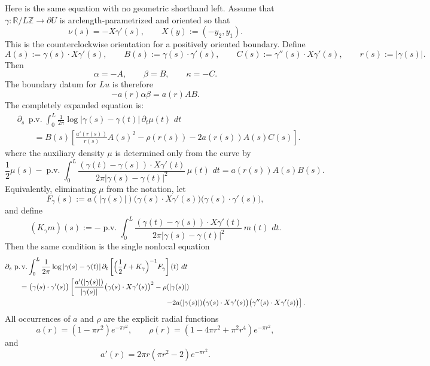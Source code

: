 \documentclass[11pt]{article}
\newcommand{\R}{\mathbb R}
\newcommand{\dd}{\,d}
\newcommand{\1}{\mathbf 1}
\begin{document}
Here is the same equation with no geometric shorthand left.  Assume that
\(\gamma:\R/L\mathbb Z\to\partial U\) is arclength-parametrized and oriented so that
\[
  \nu(s)=-X\gamma'(s),
  \qquad
  X(y):=(-y_2,y_1).
\]
This is the counterclockwise orientation for a positively oriented boundary.  Define
\[
  A(s):=\gamma(s)\cdot X\gamma'(s),
  \qquad
  B(s):=\gamma(s)\cdot\gamma'(s),
  \qquad
  C(s):=\gamma''(s)\cdot X\gamma'(s),
  \qquad
  r(s):=|\gamma(s)|.
\]
Then
\[
  \alpha=-A,\qquad
  \beta=B,\qquad
  \kappa=-C.
\]
The boundary datum for \(Lu\) is therefore
\[
  -a(r)\alpha\beta=a(r)A B.
\]
The completely expanded equation is:
\begin{equation}\label{eq:gamma-only-equation}
  \boxed{\begin{aligned}
  &\partial_s\,\operatorname{p.v.}\int_0^L
  \frac{1}{2\pi}\log|\gamma(s)-\gamma(t)|\,\partial_t\mu(t)\,\dd t \\
  &\qquad =
  B(s)\left[
  \frac{a'(r(s))}{r(s)}A(s)^2
  -\rho(r(s))
  -2a(r(s))A(s)C(s)
  \right].
  \end{aligned}}
\end{equation}
where the auxiliary density \(\mu\) is determined only from the curve by
\begin{equation}\label{eq:gamma-only-density}
  \boxed{
  \frac12\mu(s)
  -
  \operatorname{p.v.}\int_0^L
  \frac{(\gamma(t)-\gamma(s))\cdot X\gamma'(t)}
       {2\pi|\gamma(s)-\gamma(t)|^2}
  \,\mu(t)\,\dd t
  =
  a(r(s))A(s)B(s).
  }
\end{equation}
Equivalently, eliminating \(\mu\) from the notation, let
\[
  F_\gamma(s):=a(|\gamma(s)|)
  \bigl(\gamma(s)\cdot X\gamma'(s)\bigr)
  \bigl(\gamma(s)\cdot\gamma'(s)\bigr),
\]
and define
\[
  (K_\gamma m)(s):=
  -\operatorname{p.v.}\int_0^L
  \frac{(\gamma(t)-\gamma(s))\cdot X\gamma'(t)}
       {2\pi|\gamma(s)-\gamma(t)|^2}
  \,m(t)\,\dd t .
\]
Then the same condition is the single nonlocal equation
\begin{align}\label{eq:single-gamma-only-equation}
  &\partial_s\,\operatorname{p.v.}\int_0^L
  \frac{1}{2\pi}\log|\gamma(s)-\gamma(t)|
  \,\partial_t\left[
  \Bigl(\frac12 I+K_\gamma\Bigr)^{-1}F_\gamma
  \right](t)\,\dd t
  \notag\\
  &\qquad =
  \bigl(\gamma(s)\cdot\gamma'(s)\bigr)
  \left[
  \frac{a'(|\gamma(s)|)}{|\gamma(s)|}
  \bigl(\gamma(s)\cdot X\gamma'(s)\bigr)^2
  -\rho(|\gamma(s)|)
  \right. \notag\\
  &\hspace{7.8cm}\left.
  -2a(|\gamma(s)|)
  \bigl(\gamma(s)\cdot X\gamma'(s)\bigr)
  \bigl(\gamma''(s)\cdot X\gamma'(s)\bigr)
  \right].
\end{align}
All occurrences of \(a\) and \(\rho\) are the explicit radial functions
\[
  a(r)=(1-\pi r^2)e^{-\pi r^2},
  \qquad
  \rho(r)=(1-4\pi r^2+\pi^2r^4)e^{-\pi r^2},
\]
and
\[
  a'(r)=2\pi r(\pi r^2-2)e^{-\pi r^2}.
\]
\end{document}
